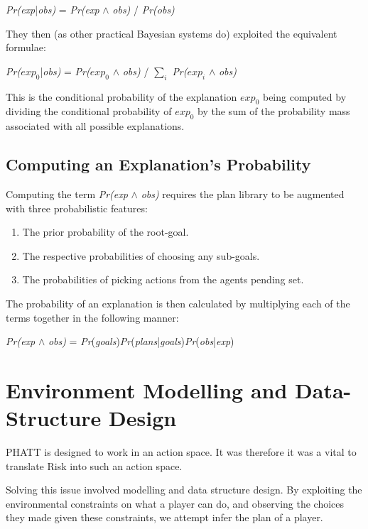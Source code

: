 \documentclass[parskip]{cs4rep}
\begin{document}
\centerline{
\textit{Pr(exp}|\textit{obs)} = \textit{Pr(exp} $\wedge$ \textit{obs)} / \textit{Pr(obs)}
}

They then (as other practical Bayesian systems do) exploited the equivalent formulae:\newline

\centerline{
\textit{Pr($exp_0$}|\textit{obs)} = \textit{Pr($exp_0$} $\wedge$ \textit{obs)} / $\displaystyle\sum\nolimits_{i}$ \textit{Pr($exp_i$} $\wedge$ \textit{obs)}
}

This is the conditional probability of the explanation $exp_0$ being computed by dividing the conditional probability of $exp_0$  by the sum of the probability mass associated with all possible explanations.

\subsection{Computing an Explanation's Probability}

Computing the term \textit{Pr(exp} $\wedge$ \textit{obs)} requires the plan library to be augmented with three probabilistic features:\newline

\begin{enumerate}
\item
The prior probability of the root-goal.
\item
The respective probabilities of choosing any sub-goals.
\item
The probabilities of picking actions from the agents pending set.
\end{enumerate}

The probability of an explanation is then calculated by multiplying each of the terms together in the following manner: \newline

\centerline{
\textit{Pr(exp} $\wedge$ \textit{obs)} = \textit{Pr}(\textit{goals})\textit{Pr}(\textit{plans}|\textit{goals})\textit{Pr}(\textit{obs}|\textit{exp})
}

\section{Environment Modelling and Data-Structure Design}

PHATT is designed to work in an action space. It was therefore it was a vital to translate Risk into such an action space. 

Solving this issue involved modelling and data structure design. By exploiting the environmental constraints on what a player can do, and observing the choices they made given these constraints, we attempt infer the plan of a player.
\end{document}
